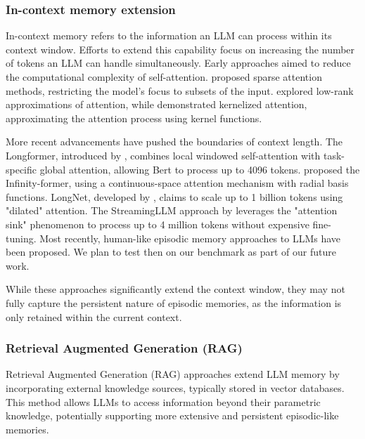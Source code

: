 \documentclass{article}
\begin{document}
\subsubsection{In-context memory extension}
In-context memory refers to the information an LLM can process within its context window. Efforts to extend this capability focus on increasing the number of tokens an LLM can handle simultaneously. Early approaches aimed to reduce the computational complexity of self-attention. \citet{Child2019} proposed sparse attention methods, restricting the model's focus to subsets of the input. \citet{Wang2020} explored low-rank approximations of attention, while \citet{Choromanski2020} demonstrated kernelized attention, approximating the attention process using kernel functions.  

More recent advancements have pushed the boundaries of context length. The Longformer, introduced by \citet{Beltagy2020}, combines local windowed self-attention with task-specific global attention, allowing Bert to process up to 4096 tokens. \citet{Martins2021} proposed the Infinity-former, using a continuous-space attention mechanism with radial basis functions. LongNet, developed by \citet{Ding2023}, claims to scale up to 1 billion tokens using "dilated" attention. The StreamingLLM approach by \citet{Xiao2023} leverages the "attention sink" phenomenon to process up to 4 million tokens without expensive fine-tuning. 
Most recently, human-like episodic memory approaches to LLMs \citep{fountas2024human,das2024larimar} have been proposed. We plan to test then on our benchmark as part of our future work.

While these approaches significantly extend the context window, they may not fully capture the persistent nature of episodic memories, as the information is only retained within the current context.

\subsubsection{Retrieval Augmented Generation (RAG)}
Retrieval Augmented Generation (RAG) approaches extend LLM memory by incorporating external knowledge sources, typically stored in vector databases. This method allows LLMs to access information beyond their parametric knowledge, potentially supporting more extensive and persistent episodic-like memories. 
\end{document}
